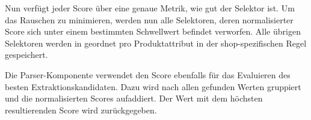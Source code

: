 Nun verfügt jeder Score über eine genaue Metrik, wie gut der Selektor ist.
Um das Rauschen zu minimieren, werden nun alle Selektoren, deren normalisierter Score sich unter einem bestimmten
Schwellwert befindet verworfen.
Alle übrigen Selektoren werden in geordnet pro Produktattribut in der shop-spezifischen Regel gespeichert.

Die Parser-Komponente verwendet den Score ebenfalls für das Evaluieren des besten Extraktionskandidaten.
Dazu wird nach allen gefunden Werten gruppiert und die normalisierten Scores aufaddiert.
Der Wert mit dem höchsten resultierenden Score wird zurückgegeben.
